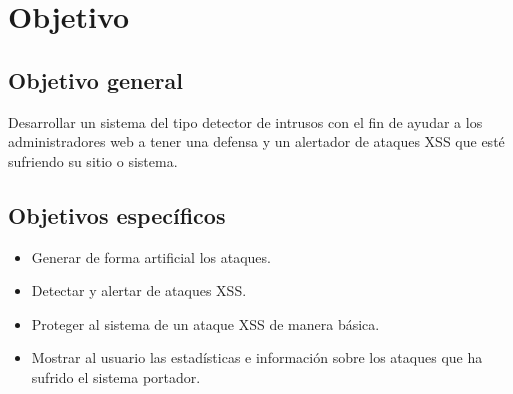\section{Objetivo}
\subsection{Objetivo general}
Desarrollar un sistema del tipo detector de intrusos con el fin de ayudar a los administradores web a tener una defensa y un alertador de ataques XSS que esté sufriendo su sitio o sistema.\\




\subsection{Objetivos específicos}

	\begin{itemize}
		\item Generar de forma artificial los ataques.
		\item Detectar y alertar de ataques XSS.
		\item Proteger al sistema de un ataque XSS de manera básica.
		\item Mostrar al usuario las estadísticas e información sobre los ataques que ha sufrido el sistema portador.
	\end{itemize}
